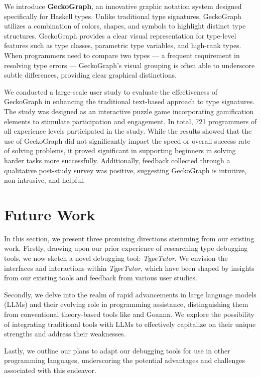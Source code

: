 We introduce \textbf{GeckoGraph}, an innovative graphic notation system designed specifically for Haskell types. Unlike traditional type signatures, GeckoGraph utilizes a combination of colors, shapes, and symbols to highlight distinct type structures. GeckoGraph provides a clear visual representation for type-level features such as type classes, parametric type variables, and high-rank types. When programmers need to compare two types — a frequent requirement in resolving type errors — GeckoGraph's visual grouping is often able to underscore subtle differences, providing clear graphical distinctions.

We conducted a large-scale user study to evaluate the effectiveness of GeckoGraph in enhancing the traditional text-based approach to type signatures. The study was designed as an interactive puzzle game incorporating gamification elements to stimulate participation and engagement. In total,  721 programmers of all experience levels participated in the study. While the results showed that the use of GeckoGraph did not significantly impact the speed or overall success rate of solving problems, it proved significant in supporting beginners in solving harder tasks more successfully. Additionally, feedback collected through a qualitative post-study survey was positive, suggesting GeckoGraph is intuitive, non-intrusive, and helpful.

\section{Future Work}

In this section, we present three promising directions stemming from our existing work. Firstly, drawing upon our prior experience of researching type debugging tools, we now sketch a novel debugging tool: \textit{TypeTutor}. We envision the interfaces and interactions within \textit{TypeTutor}, which have been shaped by insights from our existing tools and feedback from various user studies.

Secondly, we delve into the realm of rapid advancements in large language models (LLMs) and their evolving role in programming assistance, distinguishing them from conventional theory-based tools like \chameleon{} and Goanna. We explore the possibility of integrating traditional tools with LLMs to effectively capitalize on their unique strengths and address their weaknesses.

Lastly, we outline our plans to adapt our debugging tools for use in other programming languages, underscoring the potential advantages and challenges associated with this endeavor.

